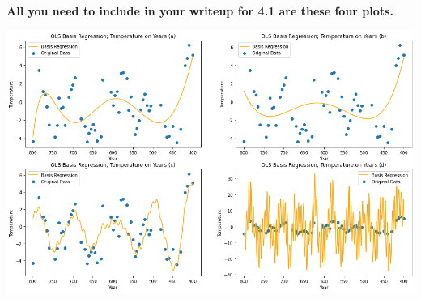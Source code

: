 \documentclass[submit]{harvardml}
\begin{document}
\begin{problem}
\begin{enumerate}
\begin{enumerate}
\end{enumerate}
\textbf{All you need to include 
in your writeup for 4.1 are these four plots.}
\vspace{1em}
\begin{center}
    \includegraphics[scale = .4]{hw1/OLS.png}
\end{center}
\end{enumerate}
\end{problem}
\end{document}
